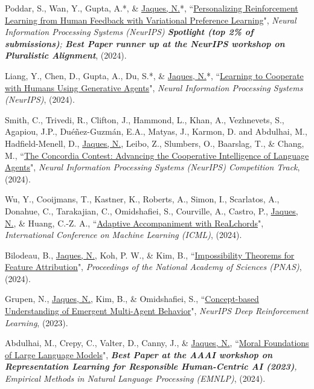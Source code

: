 \documentclass[paper=letter,fontsize=11pt]{scrartcl} %
\newcommand{\PaperEntry}[6]{
		\noindent #1, ``\href{#6}{#2}", \textit{#3}, #4 (#5).}
\begin{document}
\begin{etaremune}
\item \PaperEntry{Poddar, S., Wan, Y., Gupta, A.*, \& \underline{Jaques, N.}*}{Personalizing Reinforcement Learning from Human
Feedback with Variational Preference Learning}{Neural Information Processing Systems (NeurIPS) \textbf{Spotlight (top 2\% of submissions)}; %
\textbf{Best Paper runner up at the NeurIPS workshop on Pluralistic Alignment}}{}{2024}{https://arxiv.org/abs/2408.10075}

\item \PaperEntry{Liang, Y., Chen, D., Gupta, A., Du, S.*, \& \underline{Jaques, N.}*}{Learning to Cooperate with Humans Using Generative Agents}{Neural Information Processing Systems (NeurIPS)}{}{2024}{https://arxiv.org/abs/2411.13934}

\item \PaperEntry{Smith, C., Trivedi, R., Clifton, J., Hammond, L., Khan, A., Vezhnevets, S., Agapiou, J.P., Duéñez-Guzmán, E.A., Matyas, J., Karmon, D. and Abdulhai, M., Hadfield-Menell, D., \underline{Jaques, N.}, Leibo, Z., Slumbers, O., Baarslag, T., \& Chang, M.}{The Concordia Contest: Advancing the Cooperative Intelligence of Language Agents}{Neural Information Processing Systems (NeurIPS) Competition Track}{}{2024}{https://openreview.net/forum?id=dfeFy1PSSw}


\item \PaperEntry{Wu, Y., Cooijmans, T., Kastner, K., Roberts, A., Simon, I., Scarlatos, A., Donahue, C., Tarakajian, C., Omidshafiei, S., Courville, A., Castro, P., \underline{Jaques, N.}, \& Huang, C.-Z. A.}{Adaptive Accompaniment with ReaLchords}{International Conference on Machine Learning (ICML)}{}{2024}{https://openreview.net/pdf?id=mUVydzrkgz}



\item \PaperEntry{Bilodeau, B., \underline{Jaques, N.}, Koh, P. W., \& Kim, B.}{Impossibility Theorems for Feature Attribution}{Proceedings of the National Academy of Sciences (PNAS)}{}{2024}{https://arxiv.org/abs/2212.11870}

\item \PaperEntry{Grupen, N., \underline{Jaques, N.}, Kim, B., \& Omidshafiei, S.}{Concept-based Understanding of Emergent Multi-Agent Behavior}{NeurIPS Deep Reinforcement Learning}{}{2023}{https: workshop//openreview.net/pdf?id=W9Sn6vTYP3}

\item \PaperEntry{Abdulhai, M., Crepy, C., Valter, D., Canny, J., \& \underline{Jaques, N.}}{Moral Foundations of Large Language Models}{\textbf{Best Paper at the AAAI workshop on Representation Learning for Responsible Human-Centric AI (2023)}, Empirical Methods in Natural Language Processing (EMNLP)}{}{2024}{https://arxiv.org/abs/2310.15337}



\end{etaremune}
\end{document}
